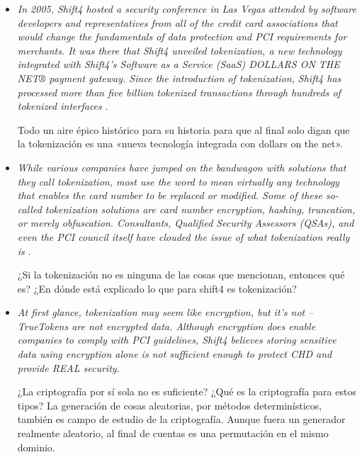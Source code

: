 \begin{itemize}

  \item \textit{In 2005, Shift4 hosted a security conference in Las Vegas
    attended by software developers and representatives from all of the credit
    card associations that would change the fundamentals of data protection and
    PCI requirements for merchants. It was there that Shift4 unveiled
    tokenization, a new technology integrated with Shift4's Software as a
    Service (SaaS) DOLLARS ON THE NET® payment gateway. Since the introduction
    of tokenization, Shift4 has processed more than five billion tokenized
    transactions through hundreds of tokenized interfaces} \cite{shift4_uno}.

    Todo un aire épico histórico para su historia para que al final solo digan
    que la tokenización es una «nueva tecnología integrada con dollars on the
    net».

  \item \textit{While various companies have jumped on the bandwagon with
    solutions that they call tokenization, most use the word to mean virtually
    any technology that enables the card number to be replaced or modified. Some
    of these so-called tokenization solutions are card number encryption,
    hashing, truncation, or merely obfuscation. Consultants, Qualified Security
    Assessors (QSAs), and even the PCI council itself have clouded the issue of
    what tokenization really is} \cite{shift4_uno}.

    ¿Si la tokenización no es ninguna de las cosas que mencionan, entonces qué
    es? ¿En dónde está explicado lo que para shift4 es tokenización?

  \item \textit{At first glance, tokenization may seem like encryption, but it's
    not – TrueTokens are not encrypted data. Although encryption does enable
    companies to comply with PCI guidelines, Shift4 believes storing sensitive
    data using encryption alone is not sufficient enough to protect CHD and
    provide REAL security.}

    ¿La criptografía por sí sola no es suficiente? ¿Qué es la criptografía para
    estos tipos? La generación de cosas aleatorias, por métodos determinísticos,
    también es campo de estudio de la criptografía. Aunque fuera un generador
    realmente aleatorio, al final de cuentas es una permutación en el mismo
    dominio.

\end{itemize}




